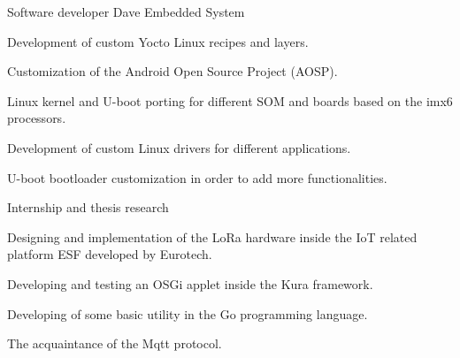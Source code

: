 \documentclass[english,a4paper]{europasscv}
\begin{document}
\begin{europasscv}


		 {
			Software developer Dave Embedded System
		}
		\ecvitem{} {
			\begin{ecvitemize}
				\item Development of custom Yocto Linux recipes and layers.
				\item Customization of the Android Open Source Project (AOSP).
				\item Linux kernel and U-boot porting for different SOM and
					boards based on the imx6 processors.
				\item Development of custom Linux drivers for different
					applications.
				\item U-boot bootloader customization in order to add
					more functionalities.
			\end{ecvitemize}
		}

		 {
			Internship and thesis research
		}
		\ecvitem{} {
			\begin{ecvitemize}
					\item Designing and implementation of the LoRa hardware
						inside the IoT related platform ESF developed by
						Eurotech.
					\item Developing and testing an OSGi applet inside the Kura
						framework.
					\item Developing of some basic utility in the Go programming
						language.
					\item The acquaintance of the Mqtt protocol.
			\end{ecvitemize}
		}


\end{europasscv}
\end{document}
